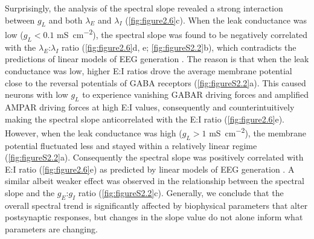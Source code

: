 
Surprisingly, the analysis of the spectral slope revealed a strong interaction between $g_L$ and both $\lambda_E$ and $\lambda_I$ (\autoref{fig:figure2.6}c). When the leak conductance was low ($g_L<0.1$ \unit{\milli\siemens\per\centi\meter\squared}), the spectral slope was found to be negatively correlated with the $\lambda_E$:$\lambda_I$ ratio (\autoref{fig:figure2.6}d, e; \autoref{fig:figureS2.2}b), which contradicts the predictions of linear models of EEG generation \cite{Gao2017}. The reason is that when the leak conductance was low, higher E:I ratios drove the average membrane potential close to the reversal potentials of GABA receptors (\autoref{fig:figureS2.2}a). This caused neurons with low $g_L$ to experience vanishing GABAR driving forces and amplified AMPAR driving forces at high E:I values, consequently and counterintuitively making the spectral slope anticorrelated with the E:I ratio (\autoref{fig:figure2.6}e). However, when the leak conductance was high ($g_L>1$ \unit{\milli\siemens\per\centi\meter\squared}), the membrane potential fluctuated less and stayed within a relatively linear regime (\autoref{fig:figureS2.2}a). Consequently the spectral slope was positively correlated with E:I ratio (\autoref{fig:figure2.6}e) as predicted by linear models of EEG generation \cite{Gao2017}. A similar albeit weaker effect was observed in the relationship between the spectral slope and the $g_E$:$g_I$ ratio (\autoref{fig:figureS2.2}c). Generally, we conclude that the overall spectral trend is significantly affected by biophysical parameters that alter postsynaptic responses, but changes in the slope value do not alone inform what parameters are changing.

